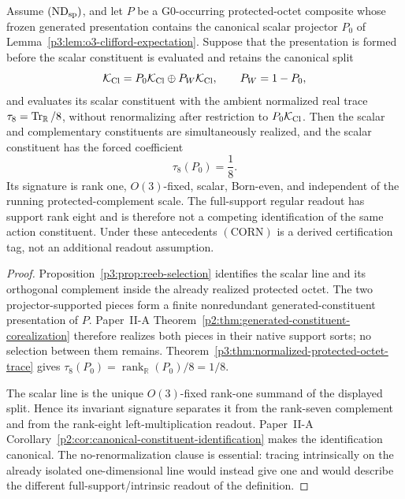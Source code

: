\documentclass[12pt,a4paper]{article}
\begin{document}
\begin{theorem}
\label{p3:thm:derived-scalar-corner-readout}
Assume \((\mathrm{ND}_{\rm sp})\), and let \(P\) be a G0-occurring
protected-octet composite whose frozen generated presentation contains the
canonical scalar projector \(P_0\) of
Lemma~\ref{p3:lem:o3-clifford-expectation}.  Suppose that the presentation is
formed before the scalar constituent is evaluated and retains the canonical
split
\[
 \mathcal K_{\rm Cl}=P_0\mathcal K_{\rm Cl}
 \oplus P_W\mathcal K_{\rm Cl},
 \qquad P_W=1-P_0,
\]
and evaluates its scalar constituent with the ambient normalized real trace
\(\tau_8=\operatorname{Tr}_{\mathbb R}/8\), without renormalizing after restriction to
\(P_0\mathcal K_{\rm Cl}\).  Then the scalar and complementary constituents
are simultaneously realized, and the scalar constituent has the forced
coefficient
\[
 \boxed{\tau_8(P_0)=\frac18.}
\]
Its signature is rank one, \(O(3)\)-fixed, scalar, Born-even, and independent
of the running protected-complement scale.  The full-support regular readout
has support rank eight and is therefore not a competing identification of the
same action constituent.  Under these antecedents \((\mathrm{CORN})\) is a
derived certification tag, not an additional readout assumption.
\end{theorem}

\begin{proof}
Proposition~\ref{p3:prop:reeb-selection} identifies the scalar line and its
orthogonal complement inside the already realized protected octet.  The two
projector-supported pieces form a finite nonredundant generated-constituent
presentation of \(P\).  Paper~II-A
Theorem~\ref{p2:thm:generated-constituent-corealization} therefore realizes
both pieces in their native support sorts; no selection between them remains.
Theorem~\ref{p3:thm:normalized-protected-octet-trace} gives
\(\tau_8(P_0)=\operatorname{rank}_{\mathbb R}(P_0)/8=1/8\).

The scalar line is the unique \(O(3)\)-fixed rank-one summand of the displayed
split.  Hence its invariant signature separates it from the rank-seven
complement and from the rank-eight left-multiplication readout.  Paper~II-A
Corollary~\ref{p2:cor:canonical-constituent-identification} makes the
identification canonical.  The no-renormalization clause is essential: tracing
intrinsically on the already isolated one-dimensional line would instead give
one and would describe the different full-support/intrinsic readout of the
definition.
\end{proof}
\end{document}

